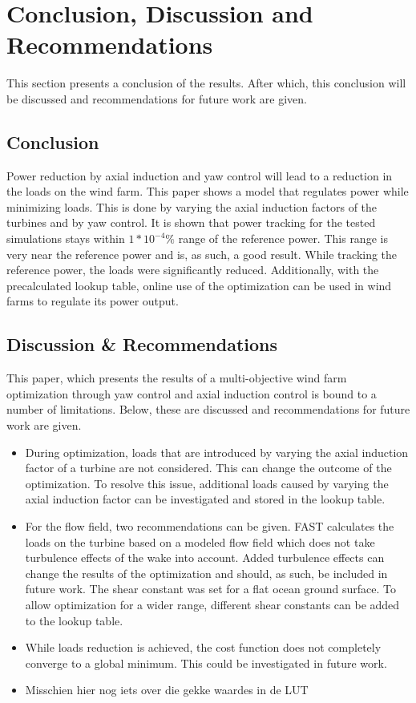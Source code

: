 \section{Conclusion, Discussion and Recommendations}
This section presents a conclusion of the results. After which, this conclusion will be discussed and recommendations for future work are given. 
\subsection{Conclusion}
Power reduction by axial  induction and yaw control will lead to a reduction in the loads on the wind farm.
This paper shows a model that regulates power while minimizing loads. This is done by varying the axial induction factors of the turbines and by yaw control. 
It is shown that power tracking for the tested simulations stays within $1*10^{-4}\%$ range of the reference power. This range is very near the reference power and is, as such, a good result. While tracking the reference power, the loads were significantly reduced.
Additionally, with the precalculated lookup table, online use of the optimization can be used in wind farms to regulate its power output.
 

\subsection{Discussion \& Recommendations}
This paper, which presents the results of a multi-objective wind farm optimization through yaw control and axial induction control is bound to a number of limitations. Below, these are discussed and recommendations for future work are given.
\begin{itemize}
	\item During optimization, loads that are introduced by varying the axial induction factor of a turbine are not considered. This can change the outcome of the optimization. To resolve this issue, additional loads caused by varying the axial induction factor can be investigated and stored in the lookup table.
	\item For the flow field, two recommendations can be given. FAST calculates the loads on the turbine based on a modeled flow field which does not take turbulence effects of the wake into account. Added turbulence effects can change the results of the optimization and should, as such, be included in future work. The shear constant was set for a flat ocean ground surface. To allow optimization for a wider range, different shear constants can be added to the lookup table.
	\item While loads reduction is achieved, the cost function does not completely converge to a global minimum. This could be investigated in future work.
	\item Misschien hier nog iets over die gekke waardes in de LUT
\end{itemize}


